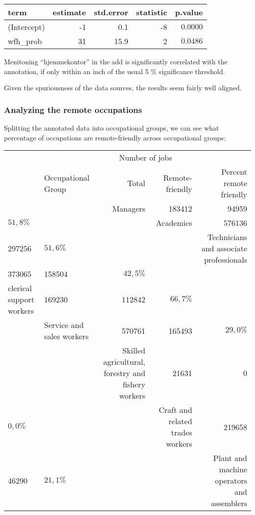 \documentclass[11pt,]{article}
\begin{document}
\captionsetup[table]{labelformat=empty,skip=1pt}
\begin{longtable}{lrrrr}
\toprule
term & estimate & std.error & statistic & p.value \\ 
\midrule
(Intercept) & -1 & 0.1 & -8 & $0.0000$ \\ 
wfh\_prob & 31 & 15.9 & 2 & $0.0486$ \\ 
\bottomrule
\end{longtable}

Menitoning ``hjemmekontor'' in the add is significantly correlated with
the annotation, if only within an inch of the usual 5 \% significance
threshold.

Given the spuriousness of the data sources, the results seem fairly well
aligned.

\hypertarget{analyzing-the-remote-occupations}{%
\subsubsection{Analyzing the remote
occupations}\label{analyzing-the-remote-occupations}}

Splitting the annotated data into occupational groups, we can see what
percentage of occupations are remote-friendly across occupational
groups:

\captionsetup[table]{labelformat=empty,skip=1pt}
\begin{longtable}{llrrr}
\toprule
& & \multicolumn{2}{c}{Number of jobs} & \\ 
 \cmidrule(lr){3-4}
 & Occupational Group & Total & Remote-friendly & Percent remote friendly \\ 
\midrule
 &  & Managers & 183412 & 94959 \\ 
$51,8\%$ &  &  & Academics & 576136 \\ 
297256 & $51,6\%$ &  &  & Technicians and associate professionals \\ 
373065 & 158504 & $42,5\%$ &  &  \\ 
clerical support workers & 169230 & 112842 & $66,7\%$ &  \\ 
 & Service and sales workers & 570761 & 165493 & $29,0\%$ \\ 
 &  & Skilled agricultural, forestry and fishery workers & 21631 & 0 \\ 
$0,0\%$ &  &  & Craft and related trades workers & 219658 \\ 
46290 & $21,1\%$ &  &  & Plant and machine operators and assemblers \\ 
\bottomrule
\end{longtable}
\end{document}
